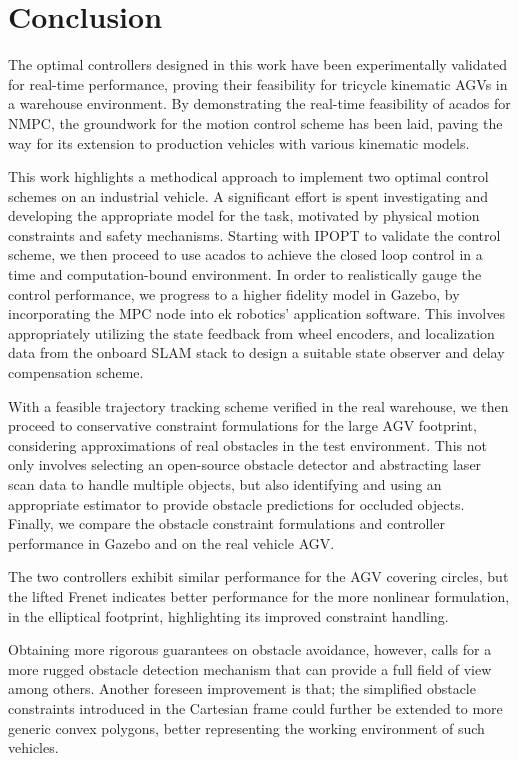 \chapter{Conclusion}\label{chap:conclusion}

The optimal controllers designed in this work have been experimentally validated for real-time performance, proving their feasibility for tricycle kinematic \ac{AGV}s in a warehouse environment. By demonstrating the real-time feasibility of acados for NMPC, the groundwork for the motion control scheme has been laid, paving the way for its extension to production vehicles with various kinematic models.
\par This work highlights a methodical approach to implement two optimal control schemes on an industrial vehicle.
A significant effort is spent investigating and developing the appropriate model for the task, motivated by physical motion constraints and safety mechanisms.    
Starting with IPOPT to validate the control scheme, we then proceed to use acados to achieve the closed loop control in a time and computation-bound environment.
In order to realistically gauge the control performance, we progress to a higher fidelity model in Gazebo, by incorporating the \ac{MPC} node into ek robotics' application software. This involves appropriately utilizing the state feedback from wheel encoders, and localization data from the onboard \ac{SLAM} stack to design a suitable state observer and delay compensation scheme.
\par With a feasible trajectory tracking scheme verified in the real warehouse, we then proceed to conservative constraint formulations for the large \ac{AGV} footprint, considering approximations of real obstacles in the test environment. This not only involves selecting an open-source obstacle detector and abstracting laser scan data to handle multiple objects, but also identifying and using an appropriate estimator to provide obstacle predictions for occluded objects. Finally, we compare the obstacle constraint formulations and controller performance in Gazebo and on the real vehicle \ac{AGV}.
\par The two controllers exhibit similar performance for the AGV covering circles, but the lifted Frenet indicates better performance for the more nonlinear formulation, in the elliptical footprint, highlighting its improved constraint handling.
\par Obtaining more rigorous guarantees on obstacle avoidance, however, calls for a more rugged obstacle detection mechanism that can provide a full field of view among others. Another foreseen improvement is that; the simplified obstacle constraints introduced in the Cartesian frame could further be extended to more generic convex polygons, better representing the working environment of such vehicles. 